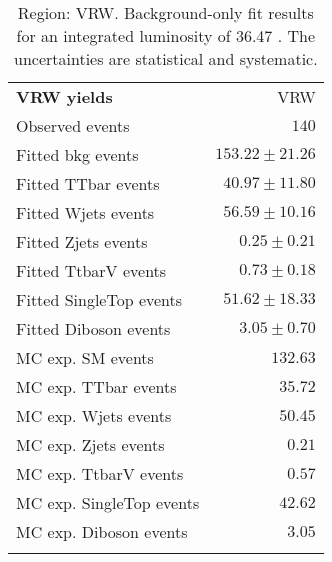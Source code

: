 

\begin{table}
\begin{center}
\setlength{\tabcolsep}{0.0pc}
{\small
\begin{tabular*}{\textwidth}{@{\extracolsep{\fill}}lr}
\noalign{\smallskip}\hline\noalign{\smallskip}
{\bf VRW yields}           & VRW              \\[-0.05cm]
\noalign{\smallskip}\hline\noalign{\smallskip}
Observed events          & $140$                    \\
\noalign{\smallskip}\hline\noalign{\smallskip}
Fitted bkg events         & $153.22 \pm 21.26$              \\
\noalign{\smallskip}\hline\noalign{\smallskip}
        Fitted TTbar events         & $40.97 \pm 11.80$              \\
        Fitted Wjets events         & $56.59 \pm 10.16$              \\
        Fitted Zjets events         & $0.25 \pm 0.21$              \\
        Fitted TtbarV events         & $0.73 \pm 0.18$              \\
        Fitted SingleTop events         & $51.62 \pm 18.33$              \\
        Fitted Diboson events         & $3.05 \pm 0.70$              \\
 \noalign{\smallskip}\hline\noalign{\smallskip}
MC exp. SM events              & $132.63$              \\
\noalign{\smallskip}\hline\noalign{\smallskip}
        MC exp. TTbar events         & $35.72$              \\
        MC exp. Wjets events         & $50.45$              \\
        MC exp. Zjets events         & $0.21$              \\
        MC exp. TtbarV events         & $0.57$              \\
        MC exp. SingleTop events         & $42.62$              \\
        MC exp. Diboson events         & $3.05$              \\
\noalign{\smallskip}\hline\noalign{\smallskip}
\end{tabular*}
}
\end{center}
\caption{Region: VRW. Background-only fit results for an integrated luminosity of 36.47 \ifb. The uncertainties are statistical and systematic.
}
\label{table.bkgonly.VRW}
\end{table}
%